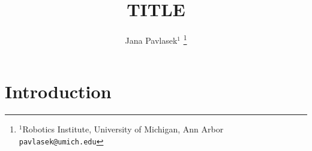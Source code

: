 \documentclass[letterpaper, 10 pt, conference]{ieeeconf}  %
\title{\LARGE \bf
TITLE
}
\author{Jana Pavlasek$^{1}$
\thanks{$^{1}$Robotics Institute, University of Michigan, Ann Arbor
        {\tt\small pavlasek@umich.edu}}
}
\begin{document}
\maketitle
\thispagestyle{plain}
\pagestyle{plain}

\begin{abstract}
\end{abstract}

\section{Introduction}


% 
\end{document}
